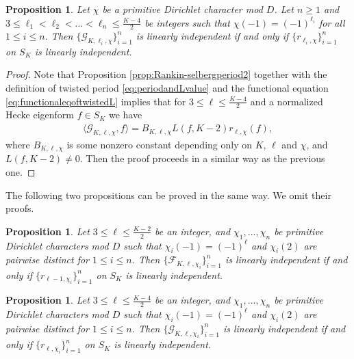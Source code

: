 \documentclass[11pt,letterpaper,reqno]{amsart}
\newcommand\ques[1]{\textcolor{blue}{\textbf{Question}: #1}}
\numberwithin{figure}{section}
\numberwithin{table}{section}
\theoremstyle{definition}
\theoremstyle{plain}
\newtheorem{proposition}[theorem]{Proposition}
\theoremstyle{definition}
\theoremstyle{definition}
\theoremstyle{remark}
\numberwithin{equation}{section}
\theoremstyle{remark}
\begin{document}
\begin{proposition}\label{prop:linearindeperiodtomodularform2}
Let $\chi$ be a primitive Dirichlet character mod $D$. Let $n\geq1$ and $3\leq\ell_1<\ell_2<...<\ell_n\leq\frac{K-4}{2}$ be integers such that $\chi(-1)=(-1)^{\ell_i}$ for all $1\leq i\leq n$. Then
$\{\mathcal{G}_{K,\ell_i,\chi}\}_{i=1}^n$ is linearly independent if and only if $\{r_{\ell_i,\chi}\}_{i=1}^n$ on $S_K$ is linearly independent.
\end{proposition}
\begin{proof}
    Note that Proposition \ref{prop:Rankin-selbergperiod2} together with the definition of twisted period \eqref{eq:periodandLvalue}  and the functional equation \eqref{eq:functionaleqoftwistedL} implies that for $3\leq\ell\leq\frac{K-4}{2}$ and a normalized Hecke eigenform $f\in S_K$ we have
\begin{align}
\langle\mathcal{G}_{K,\ell,\chi},f\rangle=B_{K,\ell,\chi}L(f,K-2) r_{\ell,\chi}(f), \nonumber
\end{align}
 where $B_{K,\ell,\chi}$ is some nonzero constant depending only on $K$, $\ell$ and $\chi$, and $L(f,K-2)\neq0$. Then the proof proceeds in a similar way as the previous one.
\end{proof}
The following two propositions can be proved in the same way. We omit their proofs.
\begin{proposition}
   Let $3\leq\ell\leq\frac{K-2}{2}$ be an integer, and $\chi_1,...,\chi_n$ be primitive Dirichlet characters mod $D$ such that $\chi_i(-1)=(-1)^{\ell}$ and $\chi_i(2)$ are pairwise distinct for $1\leq i\leq n$. Then $\{\mathcal{F}_{K,\ell,\chi_i}\}_{i=1}^n$ is linearly independent if and only if $\{r_{\ell-1,\chi_i}\}_{i=1}^n$ on $S_K$ is linearly independent.
\end{proposition}
\begin{proposition}
   Let $3\leq\ell\leq\frac{K-4}{2}$ be an integer, and $\chi_1,...,\chi_n$ be primitive Dirichlet characters mod $D$ such that $\chi_i(-1)=(-1)^{\ell}$ and $\chi_i(2)$ are pairwise distinct for $1\leq i\leq n$. Then $\{\mathcal{G}_{K,\ell,\chi_i}\}_{i=1}^n$ is linearly independent if and only if $\{r_{\ell,\chi_i}\}_{i=1}^n$ on $S_K$ is linearly independent.
\end{proposition}

\end{document}
